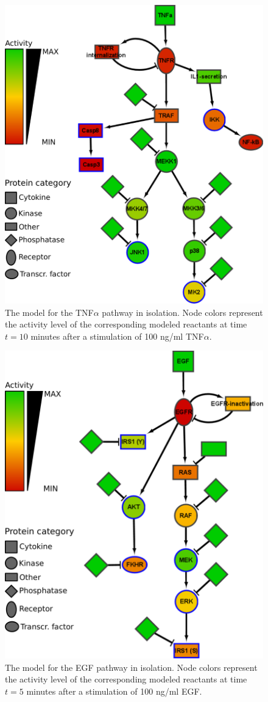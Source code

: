 \documentclass{bmcart}
\begin{document}
\begin{figure}[htpb]
\begin{minipage}{\textwidth}
\centering
  \includegraphics[width=.7\textwidth]{images/large_network_tnfa2}
\caption{The model for the TNF$\alpha$ pathway in isolation. Node colors represent the activity level of the
corresponding modeled reactants at time $t = 10$ minutes after a stimulation of 100 ng/ml TNF$\alpha$.}\label{fig:large-model-tnf}
\end{minipage}
\end{figure}

\begin{figure}[!tpb]
\begin{minipage}{\textwidth}
\centering
  \includegraphics[width=.7\textwidth]{images/large_network_egf3}
\caption{The model for the EGF pathway in isolation. Node colors represent the
activity level of the corresponding modeled reactants at time $t = 5$ minutes after
a stimulation of 100 ng/ml EGF.}\label{fig:large-model-egf}
\end{minipage}
\end{figure}
\end{document}
